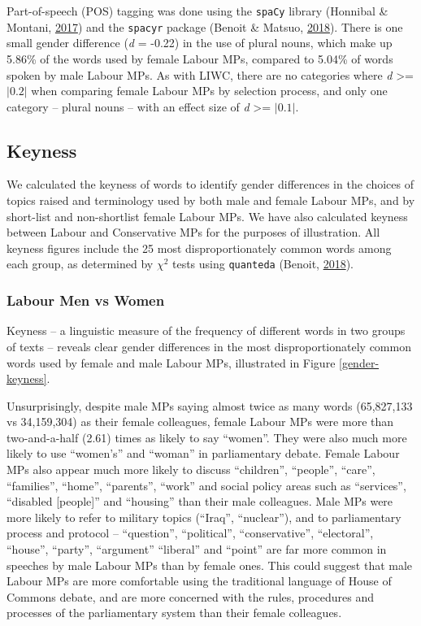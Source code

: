 \documentclass[]{article}
\begin{document}
Part-of-speech (POS) tagging was done using the \texttt{spaCy} library
(Honnibal \& Montani, \protect\hyperlink{ref-honnibal2017}{2017}) and
the \texttt{spacyr} package (Benoit \& Matsuo,
\protect\hyperlink{ref-benoit2018a}{2018}). There is one small gender
difference (\emph{d} = -0.22) in the use of plural nouns, which make up
5.86\% of the words used by female Labour MPs, compared to 5.04\% of
words spoken by male Labour MPs. As with LIWC, there are no categories
where \emph{d} \textgreater{}= \(|0.2|\) when comparing female Labour
MPs by selection process, and only one category -- plural nouns -- with
an effect size of \emph{d} \textgreater{}= \(|0.1|\).

\hypertarget{keyness}{%
\subsection{Keyness}\label{keyness}}

We calculated the keyness of words to identify gender differences in the
choices of topics raised and terminology used by both male and female
Labour MPs, and by short-list and non-shortlist female Labour MPs. We
have also calculated keyness between Labour and Conservative MPs for the
purposes of illustration. All keyness figures include the 25 most
disproportionately common words among each group, as determined by
\({\chi}^2\) tests using \texttt{quanteda} (Benoit,
\protect\hyperlink{ref-benoit2018}{2018}).

\hypertarget{labour-men-vs-women}{%
\subsubsection{Labour Men vs Women}\label{labour-men-vs-women}}

Keyness -- a linguistic measure of the frequency of different words in
two groups of texts -- reveals clear gender differences in the most
disproportionately common words used by female and male Labour MPs,
illustrated in Figure \ref{gender-keyness}.

Unsurprisingly, despite male MPs saying almost twice as many words
(65,827,133 vs 34,159,304) as their female colleagues, female Labour MPs
were more than two-and-a-half (2.61) times as likely to say ``women''.
They were also much more likely to use ``women's'' and ``woman'' in
parliamentary debate. Female Labour MPs also appear much more likely to
discuss ``children'', ``people'', ``care'', ``families'', ``home'',
``parents'', ``work'' and social policy areas such as ``services'',
``disabled {[}people{]}'' and ``housing'' than their male colleagues.
Male MPs were more likely to refer to military topics (``Iraq'',
``nuclear''), and to parliamentary process and protocol -- ``question'',
``political'', ``conservative'', ``electoral'', ``house'', ``party'',
``argument'' ``liberal'' and ``point'' are far more common in speeches
by male Labour MPs than by female ones. This could suggest that male
Labour MPs are more comfortable using the traditional language of House
of Commons debate, and are more concerned with the rules, procedures and
processes of the parliamentary system than their female colleagues.
\end{document}
